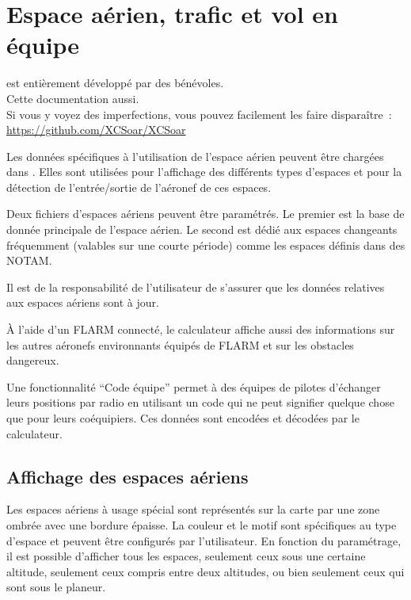 
\chapter{Espace aérien, trafic et vol en équipe}\label{cha:airspace}

\begin{framed}
	\begin{center}
		\xc{} est entièrement développé par des bénévoles.\\
		Cette documentation aussi.\\
		Si vous y voyez des imperfections, vous pouvez facilement les faire disparaître~:\\
		\url{https://github.com/XCSoar/XCSoar}
	\end{center}
\end{framed}

Les données spécifiques à l'utilisation de l'espace aérien peuvent être chargées dans \xc.
Elles sont utilisées pour l'affichage des différents types d'espaces et pour la détection de l'entrée/sortie de l'aéronef de ces espaces.

Deux fichiers d'espaces aériens peuvent être paramétrés. Le premier est la base de donnée principale de l'espace aérien.
Le second est dédié aux espaces changeants fréquemment (valables sur une courte période) comme les espaces définis dans des NOTAM.

Il est de la responsabilité de l'utilisateur de s'assurer que les données relatives aux espaces aériens sont à jour.

À l'aide d'un FLARM connecté, le calculateur affiche aussi des informations sur les autres aéronefs environnants équipés de FLARM et sur les obstacles dangereux.

Une fonctionnalité ``Code équipe'' permet à des équipes de pilotes d'échanger leurs positions par radio en utilisant un code qui ne peut signifier quelque chose que pour leurs coéquipiers. Ces données sont encodées et décodées par le calculateur.


\section{Affichage des espaces aériens}

Les espaces aériens à usage spécial sont représentés sur la carte par une zone ombrée avec une bordure épaisse.
La couleur et le motif sont spécifiques au type d'espace et peuvent être configurés par l'utilisateur.
En fonction du paramétrage, il est possible d'afficher tous les espaces, seulement ceux sous une certaine altitude, seulement ceux compris entre deux altitudes, ou bien seulement ceux qui sont sous le planeur.  

